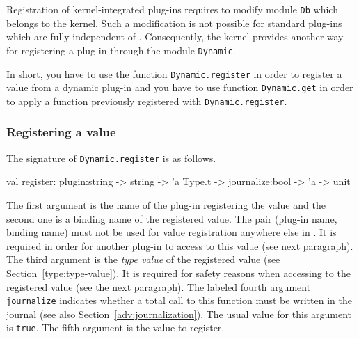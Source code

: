 Registration of kernel-integrated plug-ins requires to modify module
\texttt{Db} which belongs to the \framac kernel. Such a
modification is not possible for standard plug-ins which are fully independent
of \framac. Consequently, the \framac kernel provides another way for
registering a plug-in through the module \texttt{Dynamic}.

In short, you have to use the function
\texttt{Dynamic.register} in order to register a
value from a dynamic plug-in and you have to use function
\texttt{Dynamic.get} in order to apply a function
previously registered with \texttt{Dynamic.register}.

\subsubsection{Registering a value}

The signature of \texttt{Dynamic.register} is as
follows.
\begin{ocamlcode}
val register: plugin:string -> string -> 'a Type.t -> journalize:bool -> 'a ->
unit
\end{ocamlcode}
The first argument is the name of the plug-in registering the value and the
second one is a binding name of the registered \caml value. The pair (plug-in
name, binding name) must not be used for value registration anywhere else in
\framac. It is required in order for another plug-in to access to this value
(see next paragraph). The third argument is the \emph{type value}%
 of the registered value (see
Section~\ref{type:type-value}). It is required for safety reasons when accessing
to the registered value (see the next paragraph). The labeled fourth argument
\texttt{journalize} indicates whether a total call to this function must be
written in the journal (see also
Section~\ref{adv:journalization}). The usual value for this argument is
\texttt{true}. The fifth argument is the value to register.

